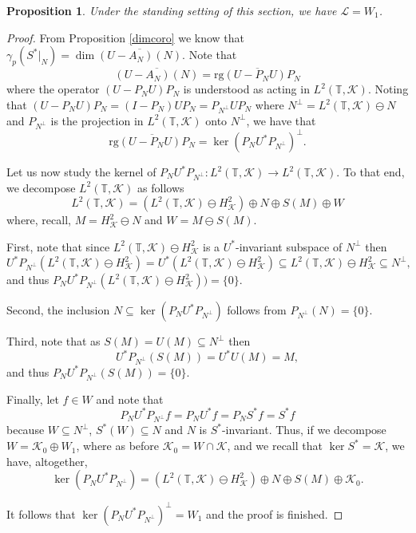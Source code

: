 \documentclass[10pt,a4paper]{amsart}
\newtheorem{proposition}{Proposition}
\def\KK{{\mathcal{K}}}
\def\T{{\mathbb{T}}}
\begin{document}
\begin{proposition}\label{dimcoro2}
Under the standing setting of this section, we have $\mathcal{L} = W_1$.\end{proposition}

\begin{proof}
From Proposition \ref{dimcoro} we know that $\gamma_p(S^*|_N)=\dim\overline{(U-A_N)(N)}$. Note that
\begin{equation*}
\overline{(U-A_N)(N)}=\overline{\text{rg}(U-P_NU)P_N}
\end{equation*}
where the operator $(U-P_NU)P_N$ is understood as acting in $L^2(\T,\KK)$. Noting that $(U-P_NU)P_N=(I-P_N)UP_N=P_{N^\perp} UP_N$ where $N^\perp=L^2(\T,\KK)\ominus N$ and $P_{N^\perp}$ is the projection in $L^2(\T,\KK)$ onto $N^\perp$, we have that
\begin{equation*}
\overline{\text{rg}(U-P_NU)P_N}=\ker(P_NU^*P_{N^\perp})^\perp.
\end{equation*}

Let us now study the kernel of $P_NU^*P_{N^\perp}:L^2(\T,\KK)\to L^2(\T,\KK)$. To that end, we decompose $L^2(\T,\KK)$ as follows
\begin{equation*}
L^2(\T,\KK)=\left(L^2(\T,\KK)\ominus H^2_\KK\right)\oplus N\oplus S(M)\oplus W
\end{equation*}
where, recall, $M=H^2_\KK\ominus N$ and $W=M\ominus S(M)$. 

First, note that since $L^2(\T,\KK)\ominus H^2_\KK$ is a $U^*$-invariant subspace of $N^\perp$ then
\begin{equation*}
U^*P_{N^\perp}(L^2(\T,\KK)\ominus H^2_\KK)=U^*(L^2(\T,\KK)\ominus H^2_\KK)\subseteq L^2(\T,\KK)\ominus H^2_\KK\subseteq N^\perp,
\end{equation*}
and thus $P_NU^*P_{N^\perp}(L^2(\T,\KK)\ominus H^2_\KK))=\{0\}$. 

Second, the inclusion $N\subseteq\ker(P_NU^*P_{N^\perp})$ follows from $P_{N^\perp}(N)=\{0\}$. 

Third, note that as $S(M)=U(M)\subseteq N^\perp$ then
\begin{equation*}
U^*P_{N^\perp}(S(M)) =U^*U(M)=M,
\end{equation*}
and thus $P_NU^*P_{N^\perp}(S(M))=\{0\}$.

Finally, let $f\in W$ and note that
\begin{equation*}
P_NU^*P_{N^\perp} f=P_NU^*f=P_NS^*f=S^*f
\end{equation*} 
because $W\subseteq N^\perp$, $S^*(W)\subseteq N$ and $N$ is $S^*$-invariant. Thus, if we decompose $W=\KK_0\oplus W_1$, where as before $\KK_0=W\cap\KK$, and we recall that $\ker S^*=\KK$, we have, altogether,
\begin{equation*}
\ker(P_NU^*P_{N^\perp})=\left(L^2(\T,\KK)\ominus H^2_\KK\right)\oplus N\oplus S(M)\oplus \KK_0.
\end{equation*}



It follows that $\ker(P_NU^*P_{N^\perp})^\perp=W_1$ and the proof is finished.
\end{proof}
\end{document}
